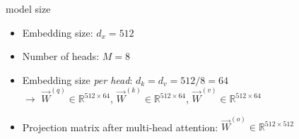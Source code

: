 \documentclass[11pt,compress,t,notes=noshow, xcolor=table]{beamer}
\begin{document}
\begin{vbframe}{model size}

\vfill

\begin{itemize}
\item Embedding size: $d_x = 512$
\item Number of heads: $M = 8$
\item Embedding size \textit{per head}: $d_k = d_v = 512/8 = 64$\\\medskip
			$\to$ $\vec W^{(q)} \in \mathbb{R}^{512 \times 64}$, $\vec W^{(k)} \in \mathbb{R}^{512 \times 64}$, $\vec W^{(v)} \in \mathbb{R}^{512 \times 64}$
\item Projection matrix after multi-head attention: $\vec W^{(o)} \in \mathbb{R}^{512 \times 512}$
\end{itemize}

\vfill

\end{vbframe}


\endlecture
\end{document}
